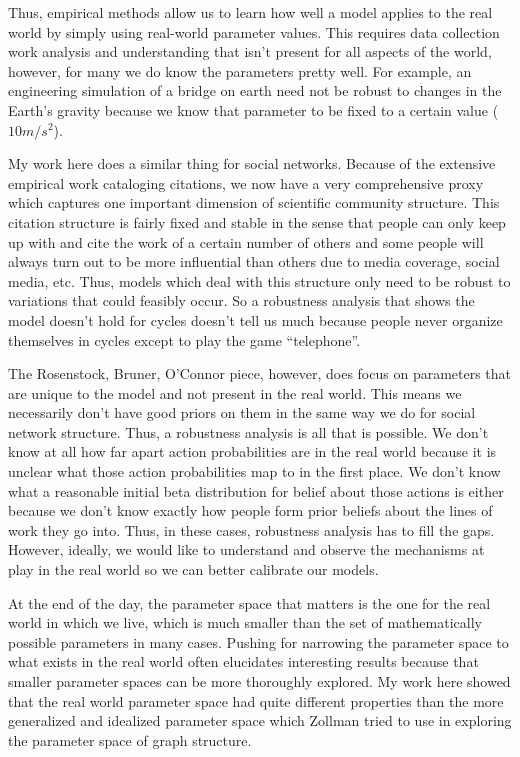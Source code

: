 Thus, empirical methods allow us to learn how well a model applies to
the real world by simply using real-world parameter values. This
requires data collection work analysis and understanding that isn't
present for all aspects of the world, however, for many we do know the
parameters pretty well. For example, an engineering simulation of a
bridge on earth need not be robust to changes in the Earth's gravity
because we know that parameter to be fixed to a certain value
(\(10 m/s^2\)).

My work here does a similar thing for social networks. Because of the
extensive empirical work cataloging citations, we now have a very
comprehensive proxy which captures one important dimension of scientific
community structure. This citation structure is fairly fixed and stable
in the sense that people can only keep up with and cite the work of a
certain number of others and some people will always turn out to be more
influential than others due to media coverage, social media, etc. Thus,
models which deal with this structure only need to be robust to
variations that could feasibly occur. So a robustness analysis that
shows the model doesn't hold for cycles doesn't tell us much because
people never organize themselves in cycles except to play the game
``telephone''.

The Rosenstock, Bruner, O'Connor piece, however, does focus on
parameters that are unique to the model and not present in the real
world. This means we necessarily don't have good priors on them in the
same way we do for social network structure. Thus, a robustness analysis
is all that is possible. We don't know at all how far apart action
probabilities are in the real world because it is unclear what those
action probabilities map to in the first place. We don't know what a
reasonable initial beta distribution for belief about those actions is
either because we don't know exactly how people form prior beliefs about
the lines of work they go into. Thus, in these cases, robustness
analysis has to fill the gaps. However, ideally, we would like to
understand and observe the mechanisms at play in the real world so we
can better calibrate our models.

At the end of the day, the parameter space that matters is the one for
the real world in which we live, which is much smaller than the set of
mathematically possible parameters in many cases. Pushing for narrowing
the parameter space to what exists in the real world often elucidates
interesting results because that smaller parameter spaces can be more
thoroughly explored. My work here showed that the real world parameter
space had quite different properties than the more generalized and
idealized parameter space which Zollman tried to use in exploring the
parameter space of graph structure.

